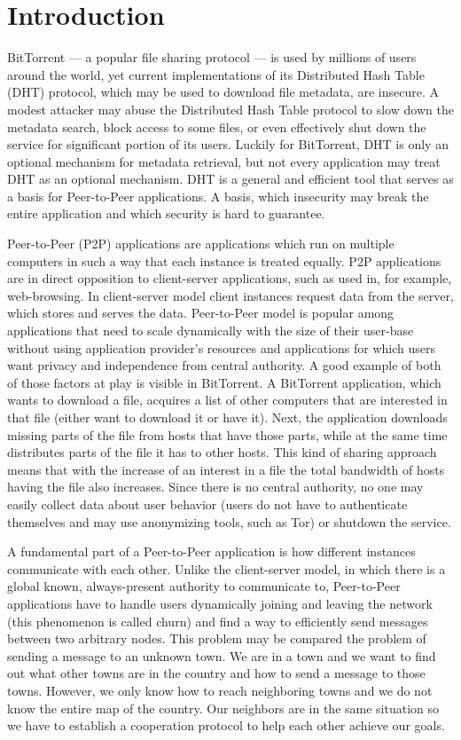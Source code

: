 \chapter{Introduction}

BitTorrent --- a popular file sharing protocol --- is used by millions of users
around the world, yet current implementations of its Distributed Hash Table
(DHT) protocol, which may be used to download file metadata, are insecure.
A modest attacker may abuse the Distributed Hash Table protocol to slow down the
metadata search, block access to some files, or even effectively shut down the
service for significant portion of its users.
Luckily for BitTorrent, DHT is only an optional mechanism for metadata
retrieval, but not every application may treat DHT as an optional mechanism.
DHT is a general and efficient tool that serves as a basis for Peer-to-Peer
applications.
A basis, which insecurity may break the entire application and which security is
hard to guarantee.

Peer-to-Peer (P2P) applications are applications which run on multiple computers
in such a way that each instance is treated equally.
P2P applications are in direct opposition to client-server applications, such as
used in, for example, web-browsing.
In client-server model client instances request data from the server, which
stores and serves the data.
Peer-to-Peer model is popular among applications that need to scale dynamically
with the size of their user-base without using application provider's resources
and applications for which users want privacy and independence from central
authority.
A good example of both of those factors at play is visible in BitTorrent.
A BitTorrent application, which wants to download a file, acquires a list of
other computers that are interested in that file (either want to download it or
have it).
Next, the application downloads missing parts of the file from hosts that have
those parts, while at the same time distributes parts of the file it has to
other hosts.
This kind of sharing approach means that with the increase of an interest in a
file the total bandwidth of hosts having the file also increases.
Since there is no central authority, no one may easily collect data about user
behavior (users do not have to authenticate themselves and may use anonymizing
tools, such as Tor) or shutdown the service.

A fundamental part of a Peer-to-Peer application is how different instances
communicate with each other.
Unlike the client-server model, in which there is a global known, always-present
authority to communicate to, Peer-to-Peer applications have to handle users
dynamically joining and leaving the network (this phenomenon is called churn)
and find a way to efficiently send messages between two arbitrary nodes.
This problem may be compared the problem of sending a message to an unknown
town.
We are in a town and we want to find out what other towns are in the country and
how to send a message to those towns.
However, we only know how to reach neighboring towns and we do not know the
entire map of the country.
Our neighbors are in the same situation so we have to establish a cooperation
protocol to help each other achieve our goals.

